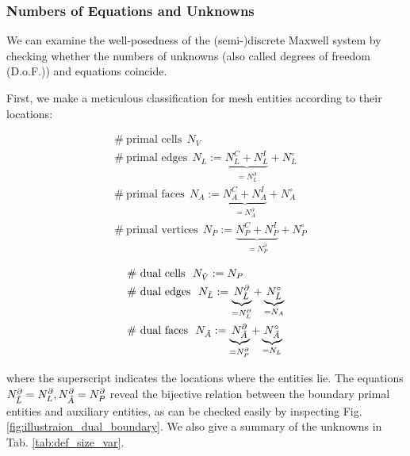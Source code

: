 \documentclass{article}
\begin{document}
\subsubsection{Numbers of Equations and Unknowns}

We can examine the well-posedness of the (semi-)discrete Maxwell system by checking whether the numbers of unknowns (also called degrees of freedom (D.o.F.)) and equations coincide. 

First, we make a meticulous classification for mesh entities according to their locations:
\begin{center}
\vspace{-0.5cm}
\begin{minipage}[t]{0.4\textwidth}
    \begin{align*}
        &\#\  \text{primal cells}\ \  N_V \\
        &\#\  \text{primal edges}\ \  N_L := \underbrace{N^C_L + N^I_L}_{=N^\partial_L} + N^\circ_L  \\
        &\#\  \text{primal faces}\ \  N_A := \underbrace{N_A^C + N^I_A}_{=N^\partial_A} + N^\circ_A  \\
        &\#\  \text{primal vertices}\ \  N_P := \underbrace{N_P^C + N^I_P}_{=N^\partial_P} + N^\circ_P
    \end{align*}
\end{minipage}
\begin{minipage}[t]{0.4\textwidth}
    \begin{align*}
        &\#\  \text{dual cells}\ \  N_{\Tilde{V}} := N_P \\
        &\#\  \text{dual edges}\ \  N_{\Tilde{L}} := \underbrace{N^\partial_{\Tilde{L}}}_{=N^\partial_L} + \underbrace{N^\circ_{\Tilde{L}}}_{=N_A} \\
        &\#\  \text{dual faces}\ \  N_{\Tilde{A}} := \underbrace{N^\partial_{\Tilde{A}}}_{=N^\partial_P} + \underbrace{N^\circ_{\Tilde{A}}}_{=N_L}
    \end{align*}
\end{minipage}   
\end{center}
where the superscript indicates the locations where the entities lie. The equations $N^\partial_{\Tilde{L}} = N^\partial_L, N^\partial_{\Tilde{A}} = N^\partial_P$ reveal the bijective relation between the boundary primal entities and auxiliary entities, as can be checked easily by inspecting Fig. \ref{fig:illustraion_dual_boundary}.
We also give a summary of the unknowns in Tab. \ref{tab:def_size_var}.
\end{document}
